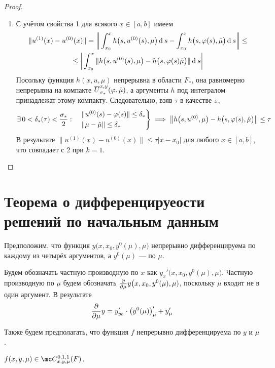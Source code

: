 \begin{proof}
\begin{itemize}
\begin{enumerate}
        \item С учётом свойства 1 для всякого $ x \in [a, b] $ имеем
        \begin{multline*}
            \| u^{(1)}(x) - u^{(0)}(x) \| = \bigg\| \int_{x_0}^x h \big( s, u^{(0)}(s), \mu \big) \operatorname{d}^{} s - \int_{x_0}^x h \big( s, \varphi(s), \hat \mu \big) \operatorname{d}^{} s \bigg\| \le \\
            \le \bigg| \int_{x_0}^x \| h \big( s, u^{(0)}(s), \mu \big) - h \big( s, \varphi(s) \hat \mu \big) \| \operatorname{d}^{} s \bigg|
        \end{multline*}
        Посольку функция $ h(x, u, \mu) $ непрерывна в области $ F_* $, она равномерно непрерывна на компакте $ \overline U_{\sigma_*}^{x, y}(\varphi, \hat \mu) $, а аргументы $ h $ под интегралом принадлежат этому компакту. Следовательно, взяв $ \tau $ в качестве $ \varepsilon $,
        $$ \exists\, 0 < \delta_*(\tau) < \frac{\sigma_*}2 : \quad
        \begin{rcases}
            \| u^{(0)}(s) - \varphi(s) \| \le \delta_* \\
            \| \mu - \hat \mu \| \le \delta_*
        \end{rcases} \implies \big\| h \big( s, u^{(0)}, \mu \big) - h \big( s, \varphi(s), \hat \mu \big) \big\| \le \tau $$
        В результате $ \| u^{(1)}(x) - u^{(0)}(x) \| \le \tau |x - x_0| $ для любого $ x \in [a, b] $, что совпадает с 2 при $ k = 1 $.
    \end{enumerate}
    \end{itemize}

\end{proof}

\section{Теорема о дифференцируеости решений по начальным данным}

Предположим, что функция $ y \big(x, x_0, y^0(\mu), \mu \big) $ непрерывно дифференцируема по каждому из четырёх аргументов, а $ y^0(\mu) $ --- по $ \mu $.

Будем обозначать частную производную по $ x $ как $ y_x'\big( x, x_0, y^0(\mu), \mu \big) $. Частную производную по $ \mu $ будем обозначать $ \frac{\partial {}}{\partial {\mu}} y \big( x, x_0, y^0(\mu), \mu) $, поскольку $ \mu $ входит не в один аргумент. В результате
$$ \frac{\partial {}}{\partial {\mu}} y = y_{y_0}' \cdot \big( y^0(\mu) \big)_\mu' + y_\mu' $$

Также будем предполагать, что функция $ f $ непрерывно дифференцируема по $ y $ и $ \mu $.
\begin{notation}
    $ f(x, y, \mu) \in \mc C_{x, y, \mu}^{0, 1, 1}(F) $.
\end{notation}

